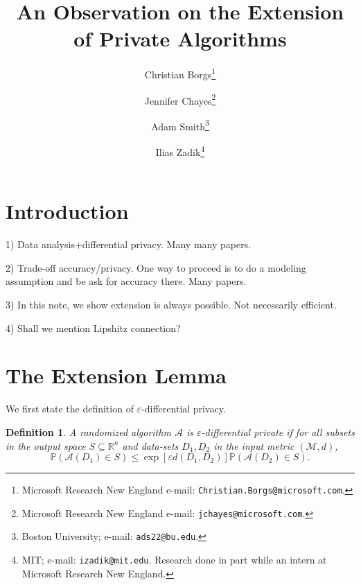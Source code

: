 \documentclass[12pt,a4paper]{article}
\author{
{\sf Christian Borgs}\thanks{Microsoft Research New England e-mail: {\tt Christian.Borgs@microsoft.com}. }
\and
{\sf Jennifer Chayes}\thanks{Microsoft Research New England e-mail: {\tt jchayes@microsoft.com}.}
\and
{\sf Adam Smith}\thanks{Boston University; e-mail: {\tt ads22@bu.edu}. }
\and
{\sf Ilias Zadik}\thanks{MIT; e-mail: {\tt izadik@mit.edu}. Research done in part while an intern at Microsoft Research New England. }
}
\newtheorem{definition}[theorem]{Definition}
\numberwithin{equation}{section}
\numberwithin{equation}{section}
\renewcommand{\epsilon}{\varepsilon}
\newcommand{\1}{{\text{\Large $\mathfrak 1$}}}
\newcommand{\2}[1]{{\text{\Large $\mathfrak 1$}\!\left(#1\right)}}
\begin{document}
\title{An Observation on the Extension\\ of Private Algorithms}
\date{}




\maketitle

\begin{abstract}

\end{abstract}

\section{Introduction}

1) Data analysis+differential privacy. Many many papers.


2) Trade-off accuracy/privacy. One way to proceed is to do a modeling assumption and be ask for accuracy there. Many papers.

3) In this note, we show extension is always possible. Not necessarily efficient.

4) Shall we mention Lipshitz connection?


\section{The Extension Lemma}

We first state the definition of $\epsilon$-differential privacy.\begin{definition}
A randomized algorithm $\mathcal{A}$ is $\epsilon$-differential private if for all subsets in the output space $S \subseteq \mathbb{R}^n$ and data-sets $D_1,D_2$ in the input metric $(\mathcal{M},d)$,  $$\mathbb{P}\left(\mathcal{A}(D_1) \in S\right) \leq \exp\left[\epsilon d(D_1,D_2)\right]\mathbb{P}\left(\mathcal{A}(D_2) \in S\right).$$
\end{definition}
\end{document}
